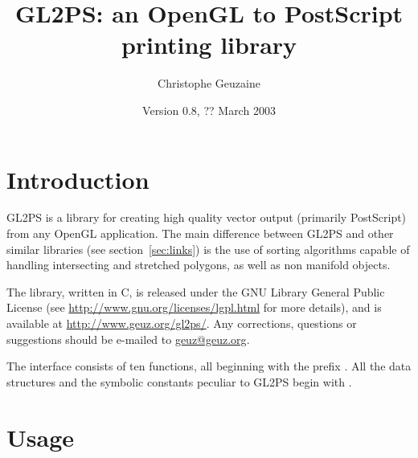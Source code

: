 \documentclass[10pt]{article}
\newcommand{\dd}{\begingroup\Url}
\newcommand{\email}[2]{\href{mailto:#2}{#1}}
\begin{document}
\title{GL2PS: an OpenGL to PostScript printing library}
\author{Christophe Geuzaine}
\date{Version 0.8, ?? March 2003}

\maketitle


\tableofcontents

\section{Introduction}

GL2PS is a library for creating high quality vector output (primarily
PostScript) from any OpenGL application. The main difference between GL2PS
and other similar libraries (see section~\ref{sec:links}) is the use of
sorting algorithms capable of handling intersecting and stretched polygons,
as well as non manifold objects.

The library, written in C, is released under the GNU Library General Public
License (see \url{http://www.gnu.org/licenses/lgpl.html} for more details),
and is available at \url{http://www.geuz.org/gl2ps/}. Any corrections,
questions or suggestions should be e-mailed to
\email{geuz@geuz.org}{geuz@geuz.org}.

The interface consists of ten functions, all beginning with the prefix
\dd{gl2ps}. All the data structures and the symbolic constants peculiar to
GL2PS begin with \dd{GL2PS}.


\section{Usage}

\end{document}
